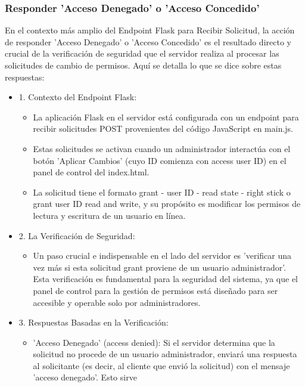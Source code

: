 \documentclass{report}
\begin{document}
\subsubsection{Responder 'Acceso Denegado' o 'Acceso Concedido'}
En el contexto más amplio del Endpoint Flask para Recibir Solicitud, la acción de responder 'Acceso Denegado' o 'Acceso Concedido' 
es el resultado directo y crucial de la verificación de seguridad que el servidor realiza al procesar las solicitudes de cambio de permisos.
Aquí se detalla lo que se dice sobre estas respuestas:
\begin{itemize}
    \item 1. Contexto del Endpoint Flask:
        \begin{itemize}
            \item La aplicación Flask en el servidor está configurada con un endpoint para recibir solicitudes POST provenientes del código 
            JavaScript en main.js.
            \item Estas solicitudes se activan cuando un administrador interactúa con el botón 'Aplicar Cambios' 
            (cuyo ID comienza con access user ID) en el panel de control del index.html.
            \item La solicitud tiene el formato grant - user ID - read state - right stick o grant user ID read and write, y su propósito es 
            modificar los permisos de lectura y escritura de un usuario en línea.
        \end{itemize}
    \item 2. La Verificación de Seguridad:
        \begin{itemize}
            \item Un paso crucial e indispensable en el lado del servidor es 'verificar una vez más si esta solicitud grant proviene de un 
            usuario administrador'. Esta verificación es fundamental para la seguridad del sistema, ya que el panel de control para la 
            gestión de permisos está diseñado para ser accesible y operable solo por administradores.
        \end{itemize}
    \item 3. Respuestas Basadas en la Verificación:
        \begin{itemize}
            \item 'Acceso Denegado' (access denied): Si el servidor determina que la solicitud no procede de un usuario administrador, 
            enviará una respuesta al solicitante (es decir, al cliente que envió la solicitud) con el mensaje 'acceso denegado'. Esto sirve 

\end{itemize}
\end{itemize}
\end{document}
